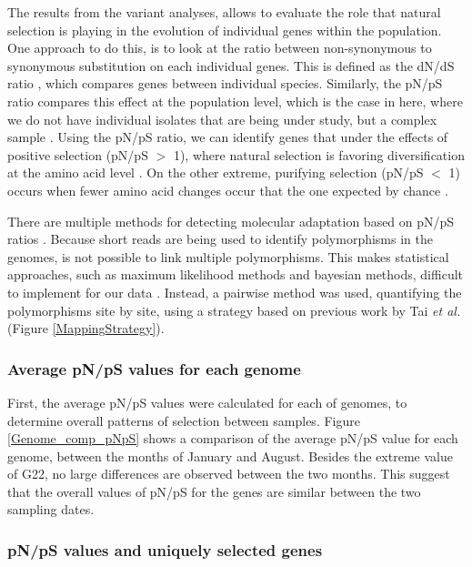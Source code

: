 The results from the variant analyses, allows to evaluate the role that natural selection is playing in the evolution of individual genes within the population. One approach to do this, is to look at the ratio between non-synonymous to synonymous substitution on each individual genes. This is defined as the dN/dS ratio \cite{McDonald:1991hj}, which compares genes between individual species. Similarly, the pN/pS ratio compares this effect at the population level, which is the case in here, where we do not have individual isolates that are being under study, but a complex sample \cite{Egea:2008jo,Schloissnig:2012hx}. Using the pN/pS ratio, we can identify genes that under the effects of positive selection (pN/pS $>$ 1), where natural selection is favoring diversification at the amino acid level \cite{Hurst:2002ht}. On the other extreme, purifying selection (pN/pS $<$ 1) occurs when fewer amino acid changes occur that the one expected by chance \cite{Hurst:2002ht}.

There are multiple methods for detecting molecular adaptation based on pN/pS ratios \cite{Yang:2000hh}. Because short reads are being used to identify polymorphisms in the genomes, is not possible to link multiple polymorphisms. This makes statistical approaches, such as maximum likelihood methods and bayesian methods, difficult to implement for our data \cite{Yang:2000hh}. Instead, a pairwise method was used, quantifying the polymorphisms site by site, using a strategy based on previous work by Tai \textit{et al.} \cite{Tai:2011jo} (Figure \ref{MappingStrategy}). 

\subsubsection{Average pN/pS values for each genome}

First, the average pN/pS values were calculated for each of genomes, to determine overall patterns of selection between samples. Figure \ref{Genome_comp_pNpS} shows a comparison of the average pN/pS value for each genome, between the months of January and August. Besides the extreme value of G22, no large differences are observed between the two months. This suggest that the overall values of pN/pS for the genes are similar between the two sampling dates.


\subsubsection{pN/pS values and uniquely selected genes}

